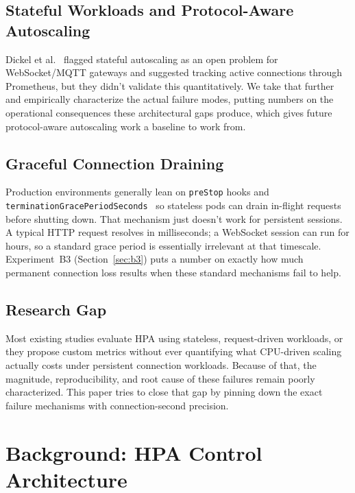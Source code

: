 \documentclass[twocolumn]{svjour3}
\begin{document}
\subsection{Stateful Workloads and Protocol-Aware Autoscaling}

Dickel et al.~\cite{dickel2019evaluation} flagged stateful autoscaling as an open
problem for WebSocket/MQTT gateways and suggested tracking active connections
through Prometheus, but they didn't validate this quantitatively. We take that
further and empirically characterize the actual failure modes, putting numbers on
the operational consequences these architectural gaps produce, which gives future
protocol-aware autoscaling work a baseline to work from.

\subsection{Graceful Connection Draining}

Production environments generally lean on \texttt{preStop} hooks and
\texttt{terminationGracePeriodSeconds}~\cite{k8s_container_lifecycle_hooks} so
stateless pods can drain in-flight requests before shutting down. That mechanism
just doesn't work for persistent sessions. A typical HTTP request resolves in
milliseconds; a WebSocket session can run for hours, so a standard grace period is
essentially irrelevant at that timescale. Experiment~B3 (Section~\ref{sec:b3})
puts a number on exactly how much permanent connection loss results when these
standard mechanisms fail to help.

\subsection{Research Gap}

Most existing studies evaluate HPA using stateless, request-driven workloads, or
they propose custom metrics without ever quantifying what CPU-driven scaling
actually costs under persistent connection workloads. Because of that, the
magnitude, reproducibility, and root cause of these failures remain poorly
characterized. This paper tries to close that gap by pinning down the exact
failure mechanisms with connection-second precision.



\section{Background: HPA Control Architecture}
\label{sec:background}
\end{document}
